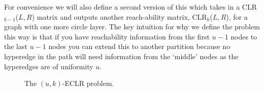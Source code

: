 \documentclass[11pt,letterpaper,pdftex]{article}
\begin{document}
For convenience we will also define a second version of this which takes in a CLR$_{k-1}$($L,R$) matrix and outputs another reach-ability matrix, CLR$_{k}$($L,R$),  for a graph with one more circle layer. The key intuition for why we define the problem this way is that if you have reachability information from the first $u-1$ nodes to the last $u-1$ nodes you can extend this to another partition because no hyperedge in the path will need information from the `middle' nodes as the hyperedges are of uniformity $u$.
\newcommand{\uECLR}[2]{$(#1,#2)$-ECLR}

\begin{figure}[ht]
    \centering
    \caption{The \uECLR{u}{k} problem.}
    \label{fig:ECLR}
\end{figure}
\end{document}
